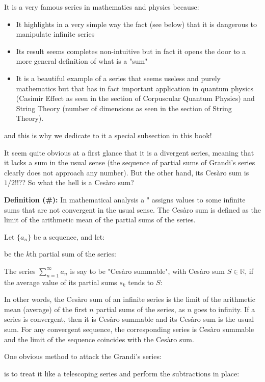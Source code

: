 	It is a very famous series in mathematics and physics because:
	\begin{itemize}
		\item It highlights in a very simple way the fact (see below) that it is dangerous to manipulate infinite series
		
		\item Its result seems completes non-intuitive but in fact it opens the door to a more general definition of what is a "sum"
		
		\item It is a beautiful example of a series that seems useless and purely mathematics but that has in fact important application in quantum physics (Casimir Effect as seen in the section of Corpuscular Quantum Physics) and String Theory (number of dimensions as seen in the section of String Theory).
	\end{itemize}
	and this is why we dedicate to it a special subsection in this book!
	
	It seem quite obvious at a first glance that it is a divergent series, meaning that it lacks a sum in the usual sense (the sequence of partial sums of Grandi's series clearly does not approach any number). But the other hand, its Cesàro sum is $1/2$!!?? So what the hell is a Cesàro sum?
	
	\textbf{Definition (\#\mydef):} In mathematical analysis a " assigns values to some infinite sums that are not convergent in the usual sense. The Cesàro sum is defined as the limit of the arithmetic mean of the partial sums of the series.
	
	Let $\{a_n\}$ be a sequence, and let:
	
	be the $k$th partial sum of the series:
	
	The series $\sum _{n=1}^{\infty }a_{n}$ is say to be "Cesàro summable", with Cesàro sum $S\in\mathbb{R}$, if the average value of its partial sums $s_k$ tends to $S$:
	
	In other words, the Cesàro sum of an infinite series is the limit of the arithmetic mean (average) of the first $n$ partial sums of the series, as $n$ goes to infinity. If a series is convergent, then it is Cesàro summable and its Cesàro sum is the usual sum. For any convergent sequence, the corresponding series is Cesàro summable and the limit of the sequence coincides with the Cesàro sum.
	
	One obvious method to attack the Grandi's series:
	
	is to treat it like a telescoping series and perform the subtractions in place:
	
